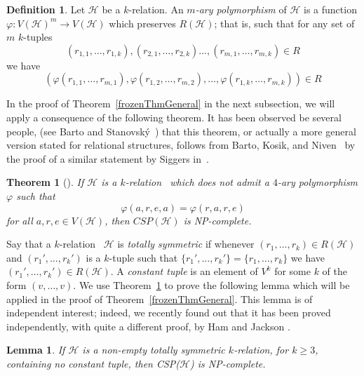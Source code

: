 \documentclass[11 pt]{amsart}
\newtheorem{thm}[equation]{Theorem}
\newtheorem{lem}[equation]{Lemma}
\theoremstyle{definition}
\newtheorem{defn}[equation]{Definition}
\theoremstyle{case}
\numberwithin{equation}{section}
\newcommand\CSP[1]{\textsc{CSP($#1$)}}
\newcommand{\kgraph}{$k$-relation}
\begin{document}
\begin{defn}
Let $\mathcal{H}$ be a \kgraph. 
An \emph{$m$-ary polymorphism} of $\mathcal{H}$ is a function $\varphi:V(\mathcal{H})^m\to V(\mathcal{H})$ which preserves $R(\mathcal{H})$; that is, such that  for any set of $m$ $k$-tuples 
\[(r_{1,1},\dots,r_{1,k}),(r_{2,1},\dots,r_{2,k})\dots,(r_{m,1},\dots,r_{m,k})\in R\]
we have 
\[\left(\varphi(r_{1,1},\dots,r_{m,1}),\varphi(r_{1,2},\dots,r_{m,2}),\dots,\varphi(r_{1,k},\dots,r_{m,k})\right)\in R\] 
\end{defn}

In the proof of Theorem~\ref{frozenThmGeneral} in the next subsection, we will apply a consequence of the following theorem. It has been observed be several people, (see Barto and Stanovsk\'y~\cite{Barto}) that this theorem, or actually a more general version stated for relational structures, follows from Barto, Kosik, and Niven~\cite{BKN} by the proof of a similar statement by Siggers in~\cite{Siggers10}. 

\begin{thm}[\cite{Barto,Siggers10}]
\label{markThm}
If $\mathcal{H}$ is a \kgraph~ which does not admit a $4$-ary polymorphism $\varphi$ such that
\[\varphi(a,r,e,a)=\varphi(r,a,r,e)\]
for all $a,r,e\in V(\mathcal{H})$, then $CSP(\mathcal{H})$ is NP-complete.

\end{thm}

Say that a \kgraph~ $\mathcal{H}$ is  \emph{totally symmetric} if whenever $(r_1,\dots,r_k)\in R(\mathcal{H})$ and $(r_1',\dots,r_k')$ is a $k$-tuple such that $\{r_1',\dots,r_k'\}=\{r_1,\dots,r_k\}$ we have $(r_1',\dots,r_k')\in R(\mathcal{H})$. A \emph{constant tuple} is an element of $V^k$ for some $k$ of the form $(v,\dots,v)$.  We use Theorem~\ref{markThm} to prove the following lemma which will be applied in the proof of Theorem~\ref{frozenThmGeneral}. This lemma is of independent interest; indeed, we recently found out that it has been proved independently, with quite a different proof, by Ham and Jackson \cite{HJ}. 

\begin{lem}
\label{symmetricLem}
If $\mathcal{H}$ is a non-empty totally symmetric \kgraph, for $k \geq 3$,  containing no  constant tuple, then \CSP{\mathcal{H}} is NP-complete.
\end{lem}
\end{document}
